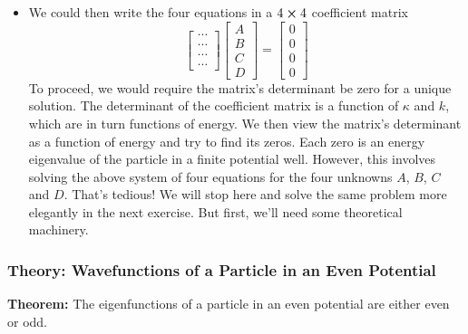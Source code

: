 \documentclass[11pt, a4paper]{article}
\begin{document}
\begin{itemize}
	\item We could then write the four equations in a $ 4 \cross 4 $ coefficient matrix
	\begin{equation*}
		\begin{bmatrix}
			\cdots \\
			\cdots \\
			\cdots \\
			\cdots 
		\end{bmatrix}
		\begin{bmatrix}
			A\\
			B\\
			C\\
			D
		\end{bmatrix}
		 = 
		 \begin{bmatrix}
		 	0\\
		 	0\\
		 	0\\
		 	0
		 \end{bmatrix}
	\end{equation*}
	To proceed, we would require the matrix's determinant be zero for a unique solution.  The determinant of the coefficient matrix is a function of $ \kappa $ and $ k $, which are in turn functions of energy. We then view the matrix's determinant as a function of energy and try to find its zeros. Each zero is an energy eigenvalue of the particle in a finite potential well. However, this involves solving the above system of four equations for the four unknowns $ A $, $ B $, $ C $ and $ D $. That's tedious! We will stop here and solve the same problem more elegantly in the next exercise. But first, we'll need some theoretical machinery.
	
	
\end{itemize}

\subsubsection{Theory: Wavefunctions of a Particle in an Even Potential}
 \textbf{Theorem:} The eigenfunctions of a particle in an even potential are either even or odd.
 
\end{document}
